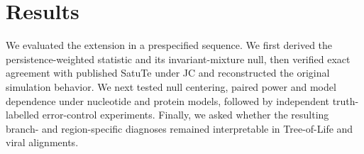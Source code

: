 \section*{Results}

We evaluated the extension in a prespecified sequence. We first derived the persistence-weighted statistic and its invariant-mixture null, then verified exact agreement with published SatuTe under JC and reconstructed the original simulation behavior. We next tested null centering, paired power and model dependence under nucleotide and protein models, followed by independent truth-labelled error-control experiments. Finally, we asked whether the resulting branch- and region-specific diagnoses remained interpretable in Tree-of-Life and viral alignments.






